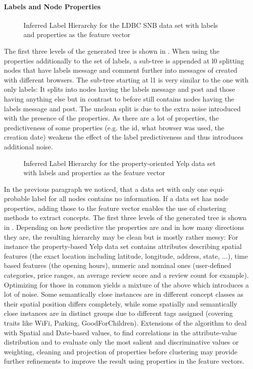  \paragraph{Labels and Node Properties}
\begin{figure}[htp]
    \centering
    
    \caption{Inferred Label Hierarchy for the LDBC SNB data set with labels and properties as the feature vector}
    \label{fig:lpldbctree}
\end{figure}{}
The first three levels of the generated tree is shown in . When using the properties additionally to the set of labels, a sub-tree is appended at l0 splitting nodes that have labels message and comment further into messages of created with different browsers. The sub-tree starting at l1 is very similar to the one with only labels: It splits into nodes having the labels message and post and those having anything else but in contrast to before still contains nodes having the labels message and post. The unclean split is due to the extra noise introduced with the presence of the properties. As there are a lot of properties, the predictiveness of some properties (e.g. the id, what browser was used, the creation date) weakens the effect of the label predictiveness and thus introduces additional noise. \\

\begin{figure}[htp]
    \centering
    
    \caption{Inferred Label Hierarchy for the property-oriented Yelp data set with labels and properties as the feature vector}
    \label{fig:lplyelpootree}
\end{figure}{}
In the previous paragraph we noticed, that a data set with only one equi-probable label for all nodes contains no information. If a data set has node properties, adding those to the feature vector enables the use of clustering methods to extract concepts. The first three levels of the generated tree is shown in . Depending on how predictive the properties are and in how many directions they are, the resulting hierarchy may be clean but is mostly rather messy: For instance the property-based Yelp data set contains attributes describing spatial features (the exact location including latitude, longitude, address, state, $\dots$), time based features (the opening hours), numeric and nominal ones (user-defined categories, price ranges, an average review score and a review count for example). Optimizing for those in common yields a mixture of the above which introduces a lot of noise. Some semantically close instances are in different concept classes as their spatial position differs completely, while some spatially and semantically close instances are in distinct groups due to different tags assigned (covering traits like WiFi, Parking, GoodForChildren). Extensions of the algorithm to deal with Spatial and Date-based values, to find correlations in the attribute-value distribution and to evaluate only the most salient and discriminative values or weighting, cleaning and projection of properties before clustering may provide further refinements to improve the result using properties in the feature vectors. \\

